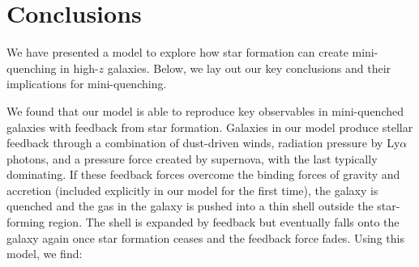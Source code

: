 \documentclass[a4paper,11pt]{article}
\begin{document}
\section{Conclusions} \label{sec:conclusion}

We have presented a model to explore how star formation can create mini-quenching in high-$z$ galaxies. Below, we lay out our key conclusions and their implications for mini-quenching.

We found that our model is able to reproduce key observables in mini-quenched galaxies with feedback from star formation. Galaxies in our model produce stellar feedback through a combination of dust-driven winds, radiation pressure by Ly$\alpha$ photons, and a pressure force created by supernova, with the last typically dominating. If these feedback forces overcome the binding forces of gravity and accretion (included explicitly in our model for the first time), the galaxy is quenched and the gas in the galaxy is pushed into a thin shell outside the star-forming region. The shell is expanded by feedback but eventually falls onto the galaxy again once star formation ceases and the feedback force fades. Using this model, we find:
\end{document}
